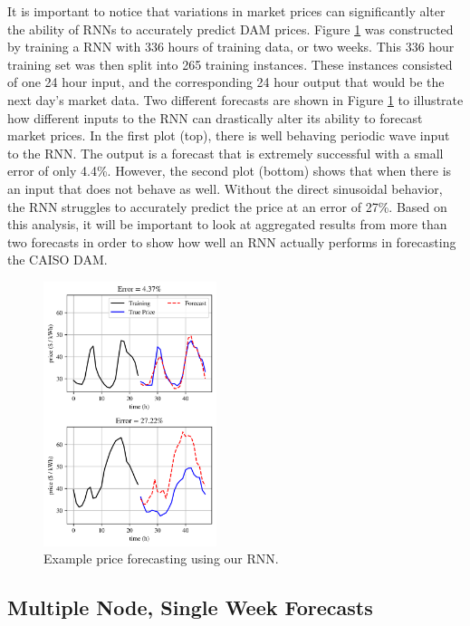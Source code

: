 \documentclass[sigconf]{acmart}
\begin{document}
It is important to notice that variations in market prices can significantly alter the ability of RNNs to accurately predict DAM prices. Figure \ref{fig:ex_forecast} was constructed by training a RNN with 336 hours of training data, or two weeks. This 336 hour training set was then split into 265 training instances. These instances consisted of one 24 hour input, and the corresponding 24 hour output that would be the next day's market data. Two different forecasts are shown in Figure \ref{fig:ex_forecast} to illustrate how different inputs to the RNN can drastically alter its ability to forecast market prices. In the first plot (top), there is well behaving periodic wave input to the RNN. The output is a forecast that is extremely successful with a small error of only 4.4\%. However, the second plot (bottom) shows that when there is an input that does not behave as well. Without the direct sinusoidal behavior, the RNN struggles to accurately predict the price at an error of 27\%. Based on this analysis, it will be important to look at aggregated results from more than two forecasts in order to show how well an RNN actually performs in forecasting the CAISO DAM.

\begin{figure}[h]
\includegraphics[width=0.45\textwidth]{fig_3.png}
\caption{Example price forecasting using our RNN.}
\label{fig:ex_forecast}
\end{figure}

\subsection{Multiple Node, Single Week Forecasts}
\end{document}
